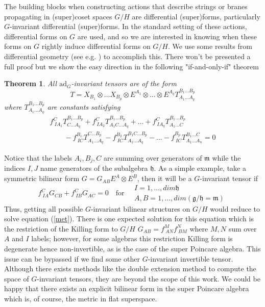 \documentclass[a4paper,12pt]{article}
\newtheorem{thm}{Theorem}
\numberwithin{equation}{section}
\numberwithin{thm}{section}
\numberwithin{exm}{section}
\newcommand{\ad}{\mathrm{ad}}
\newcommand{\<}{{\langle}}
\renewcommand{\>}{{\rangle}}
\newcommand{\mf}{\mathfrak}
\begin{document}
The building blocks when constructing actions that describe strings or branes propagating in (super)coset spaces $G/H$ are differential (super)forms, particularly $G$-invariant differential (super)forms. In the standard setting of these actions, differential forms on $G$ are used, and so we are interested in knowing when these forms on $G$ rightly induce differential forms on $G/H$. We use some results from differential geometry (see e.g. \cite{Berkovits2000}) to accomplish this. There won't be presented a full proof but we show the easy direction in the following "if-and-only-if" theorem \cite{Kobayashi1963}
\begin{thm}
All $\ad_G$-invariant tensors are of the form
	\begin{equation}
	T = X_{B_1}\otimes\ldots X_{B_p}\otimes E^{A_1}\otimes \ldots \otimes E^{A_q} T_{A_1\ldots A_q}^{B_1\ldots B_p}
	\end{equation}
where $T_{A_1\ldots A_q}^{B_1\ldots B_p}$ are constants satisfying
	\begin{equation}
		\begin{array}{l}
		f^C_{\ I A_1} T_{C\ldots A_q}^{B_1\ldots B_p}+ f^C_{\ I A_2} T_{A_1 C\ldots A_q}^{B_1\ldots B_p}+ \ldots + f^C_{\ I A_q} T_{A_1\ldots C}^{B_1\ldots B_p} \\
		\qquad - f^{B_1}_{\ I C}T_{A_1\ldots A_q}^{C\ldots B_p} - f^{B_2}_{\ I C}T_{A_1\ldots A_q}^{B_1 C\ldots B_p} -\ldots - f^{B_p}_{\ IC}T_{A_1\ldots A_n}^{B_1\ldots C} = 0
		\end{array}
	\end{equation}
\end{thm}
Notice that the labels $A_i,B_j,C$ are summing over generators of $\mf m$ while the indices $I,J$ name generators of the subalgebra $\mf h$. As a simple example, take a symmetric bilinear form $ G = G_{AB} E^A \otimes E^B $, then it will be a $G$-invariant tensor if
	\begin{equation}\label{met}
	f^C_{\ IA} G_{CB} + f^C_{\ IB} G_{AC} = 0 \quad\text{for}\quad
		\begin{array}{l}
		I = 1,\ldots, dim\mf h \\
		A,B = 1,\ldots, dim(\mf g/ \mf h = \mf m)
		\end{array}
	\end{equation}
Thus, getting all possible $G$-invariant bilinear structures on $G/H$ would reduce to solve equation (\ref{met}). There is one expected solution for this equation which is the restriction of the Killing form to $G/H$ $G_{AB} = f^M_{\ AN} f^N_{\ BM}$ where $M,N$ sum over $A$ and $I$ labels; however, for some algebras this restriction Killing form is degenerate hence non-invertible, as is the case of the super Poincare algebra. This issue can be bypassed if we find some other $G$-invariant invertible tensor. Although there exists methods \cite{Figueroa-OFarrill1994a} like the double extension method to compute the space of $G$-invariant tensors, they are beyond the scope of this work. We could be happy that there exists an explicit bilinear form in the super Poincare algebra which is, of course, the metric in flat superspace.
\end{document}
